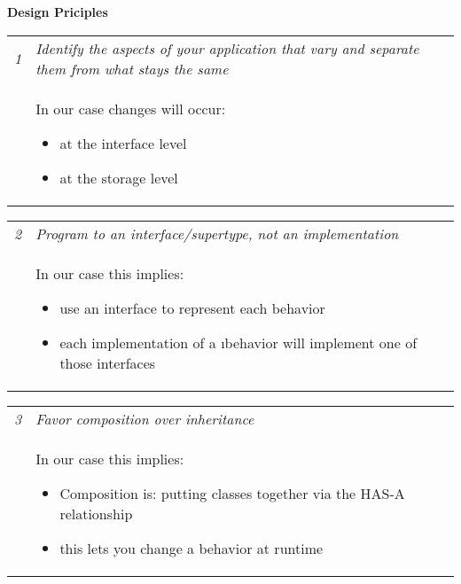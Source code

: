 \textwidth 16cm
\hoffset -1.5cm
\textheight 23cm
\voffset -1.5cm
\setlength{\parindent}{0pt}
\setlength{\parskip}{\baselineskip}
\newcommand{\planitem}[3]{
\begin{tabular}{l@{\hspace{1cm}}p{12cm}}
  {\sl #1} & {\sl #2} \\  
           & #3 \\
\end{tabular}
}

\newenvironment{simplist}{
   \vspace*{-\baselineskip}
   \begin{itemize}
      \setlength{\itemsep}{-\parsep}
      \setlength{\parsep}{0pt}
}{
   \end{itemize}
   \vspace*{-\baselineskip}
}
  

\begin{center}
   {\bf Design Priciples}\\[2em]
\end{center}

\bigskip\bigskip

\planitem{1}
{Identify the aspects of your application that vary and separate them from what stays the same}
{
     In our case changes will occur:

	\begin{simplist}
	\item at the interface level
	\item at the storage level
	\end{simplist}
}

\planitem{2}
{Program to an interface/supertype, not an implementation}
{
     In our case this implies:

	\begin{simplist}
	\item use an interface to represent each behavior
	\item each implementation of a {\i behavior} will implement one of those interfaces
	\end{simplist}
}

\planitem{3}
{Favor composition over inheritance}
{
     In our case this implies:

	\begin{simplist}
	\item Composition is: putting classes together via the HAS-A relationship
	\item this lets you change a behavior at runtime
	\end{simplist}
}


